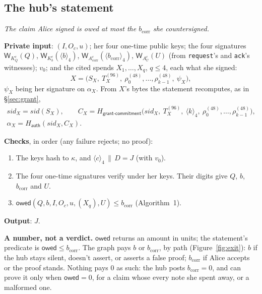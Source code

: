 \documentclass[11pt]{article}
\theoremstyle{plain}
\theoremstyle{definition}
\newcommand{\bcorr}{b_{\mathrm{corr}}}
\newcommand{\tx}[1]{\texttt{#1}}
\newcommand{\be}[2]{\langle #1\rangle_{#2}}
\newcommand{\Ht}[1]{H_{\textsf{#1}}}
\newcommand{\Wots}{\mathsf{W}}
\newcommand{\sid}{\mathit{sid}}
\newcommand{\owed}{\mathsf{owed}}
\newcommand{\Oc}{O_c}
\newcommand{\KQ}{K_{Q}^{c}}
\newcommand{\Kb}{K_{b}^{c}}
\newcommand{\Acorr}{A_{\mathrm{corr}}^{c}}
\newcommand{\AU}{A_{U}^{c}}
\begin{document}
\subsection{The hub's statement}\label{sec:statement}

\emph{The claim Alice signed is owed at most the $\bcorr$ she
countersigned.}

\textbf{Private input}: $(I, \Oc, u)$; her four one-time public keys;
the four signatures $\Wots_{\KQ}(Q)$, $\Wots_{\Kb}(\be{b}{4})$,
$\Wots_{\Acorr}(\be{\bcorr}{4})$, $\Wots_{\AU}(U)$ (from \tx{request}'s
and \tx{ack}'s witnesses); $v_0$; and the cited spends $X_1, \dots,
X_q$, $q \le 4$, each what she signed:
\[
  X = \big(S_X,\ T_X^{(96)},\ \rho_0^{(48)}, \dots, \rho_{k-1}^{(48)},\
  \psi_X\big),
\]
$\psi_X$ being her signature on $\alpha_X$. From $X$'s bytes the
statement recomputes, as in \S\ref{sec:grant},
\begin{gather*}
  \sid_X = \sid(S_X),\qquad
  C_X = \Ht{grant-commitment}\big(\sid_X,\ T_X^{(96)},\ \be{k}{4},\
  \rho_0^{(48)}, \dots, \rho_{k-1}^{(48)}\big),\\
  \alpha_X = \Ht{auth}(\sid_X, C_X).
\end{gather*}

\textbf{Checks}, in order (any failure rejects; no proof):
\begin{enumerate}[nosep]
\item The keys hash to $\kappa$, and $\be{c}{4} \,\|\, D = J$ (with $v_0$).
\item The four one-time signatures verify under her keys. Their digits
  give $Q$, $b$, $\bcorr$ and $U$.
\item $\owed(Q, b, I, \Oc, u, (X_q), U) \le \bcorr$ (Algorithm~1).
\end{enumerate}
\textbf{Output}: $J$.

\textbf{A number, not a verdict.} $\owed$ returns an amount in units;
the statement's predicate is $\owed \le \bcorr$. The graph pays $b$ or
$\bcorr$, by path (Figure~\ref{fig:exit}): $b$ if the hub stays silent,
doesn't assert, or asserts a false proof; $\bcorr$ if Alice accepts or
the proof stands. Nothing pays 0 as such: the hub posts $\bcorr = 0$,
and can prove it only when $\owed = 0$, for a claim whose every note
she spent away, or a malformed one.
\end{document}
